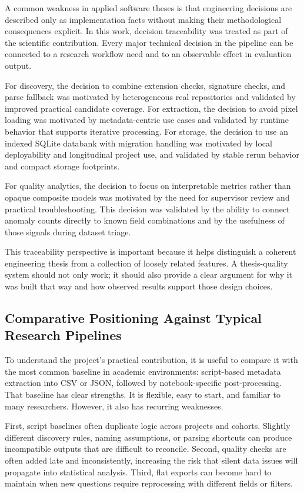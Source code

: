 A common weakness in applied software theses is that engineering decisions are described only as implementation facts without making their methodological consequences explicit. In this work, decision traceability was treated as part of the scientific contribution. Every major technical decision in the pipeline can be connected to a research workflow need and to an observable effect in evaluation output.

For discovery, the decision to combine extension checks, signature checks, and parse fallback was motivated by heterogeneous real repositories and validated by improved practical candidate coverage. For extraction, the decision to avoid pixel loading was motivated by metadata-centric use cases and validated by runtime behavior that supports iterative processing. For storage, the decision to use an indexed SQLite databank with migration handling was motivated by local deployability and longitudinal project use, and validated by stable rerun behavior and compact storage footprints.

For quality analytics, the decision to focus on interpretable metrics rather than opaque composite models was motivated by the need for supervisor review and practical troubleshooting. This decision was validated by the ability to connect anomaly counts directly to known field combinations and by the usefulness of those signals during dataset triage.

This traceability perspective is important because it helps distinguish a coherent engineering thesis from a collection of loosely related features. A thesis-quality system should not only work; it should also provide a clear argument for why it was built that way and how observed results support those design choices.

\subsection{Comparative Positioning Against Typical Research Pipelines}
To understand the project's practical contribution, it is useful to compare it with the most common baseline in academic environments: script-based metadata extraction into CSV or JSON, followed by notebook-specific post-processing. That baseline has clear strengths. It is flexible, easy to start, and familiar to many researchers. However, it also has recurring weaknesses.

First, script baselines often duplicate logic across projects and cohorts. Slightly different discovery rules, naming assumptions, or parsing shortcuts can produce incompatible outputs that are difficult to reconcile. Second, quality checks are often added late and inconsistently, increasing the risk that silent data issues will propagate into statistical analysis. Third, flat exports can become hard to maintain when new questions require reprocessing with different fields or filters.

